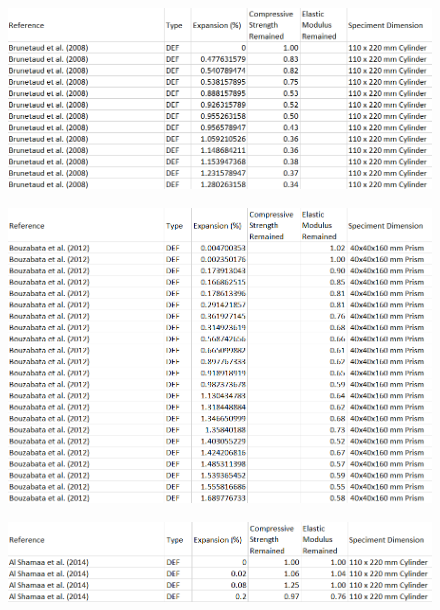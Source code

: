 \begin{figure}[h!]
  \centering
  \includegraphics[width=1.0\linewidth]{Reference/BruetaudDEFdata.png}
\end{figure}

\begin{figure}[h!]
  \centering
  \includegraphics[width=1.0\linewidth]{Reference/BouzabataDEFdata.png}
\end{figure}

\begin{figure}[h!]
  \centering
  \includegraphics[width=1.0\linewidth]{Reference/ShamaaDEFdata.png}
\end{figure}

